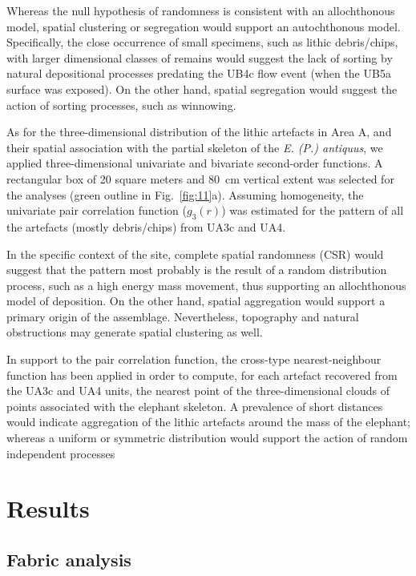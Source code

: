 \documentclass[preprint,authoryear,times]{elsarticle} %
\begin{document}
Whereas the null hypothesis of randomness is consistent with an allochthonous model, spatial clustering or segregation would support an autochthonous model. Specifically, the close occurrence of small specimens, such as lithic debris/chips, with larger dimensional classes of remains would suggest the lack of sorting by natural depositional processes predating the UB4c flow event (when the UB5a surface was exposed). On the other hand, spatial segregation would suggest the action of sorting processes, such as winnowing. %

As for the three-dimensional distribution of the lithic artefacts in Area A, and their spatial association with the partial skeleton of the \emph{E. (P.) antiquus}, we applied three-dimensional univariate and bivariate second-order functions. A rectangular box of 20 square meters and 80~cm vertical extent was selected for the analyses (green outline in Fig.~\ref{fig:11}a). Assuming homogeneity, the univariate pair correlation function ($g_3(r)$) was estimated for the pattern of all the artefacts (mostly debris/chips) from UA3c and UA4.

In the specific context of the site, complete spatial randomness (CSR) would suggest that the pattern most probably is the result of a random distribution process, such as a high energy mass movement, thus supporting an allochthonous model of deposition. On the other hand, spatial aggregation would support a primary origin of the assemblage. Nevertheless, topography and natural obstructions may generate spatial clustering as well.

In support to the pair correlation function, the cross-type nearest-neighbour function has been applied in order to compute, for each artefact recovered from the UA3c and UA4 units, the nearest point of the three-dimensional clouds of points associated with the elephant skeleton. A prevalence of short distances would indicate aggregation of the lithic artefacts around the mass of the elephant; whereas a uniform or symmetric distribution would support the action of random independent processes

\section{Results}

\subsection{Fabric analysis}
\end{document}
